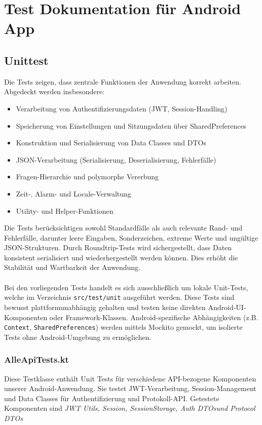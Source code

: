 \documentclass[a4paper,12pt]{article}
\begin{document}
\section{Test Dokumentation für Android App}
\subsection{Unittest}
Die Tests zeigen, dass zentrale Funktionen der Anwendung korrekt arbeiten. 
Abgedeckt werden insbesondere:

\begin{itemize}
  \item Verarbeitung von Authentifizierungsdaten (JWT, Session-Handling)
  \item Speicherung von Einstellungen und Sitzungsdaten über SharedPreferences
  \item Konstruktion und Serialisierung von Data Classes und DTOs
  \item JSON-Verarbeitung (Serialisierung, Deserialisierung, Fehlerfälle)
  \item Fragen-Hierarchie und polymorphe Vererbung
  \item Zeit-, Alarm- und Locale-Verwaltung
  \item Utility- und Helper-Funktionen
\end{itemize}
Die Tests berücksichtigen sowohl Standardfälle als auch relevante
Rand- und Fehlerfälle, darunter leere Eingaben, Sonderzeichen,
extreme Werte und ungültige JSON-Strukturen.
Durch Roundtrip-Tests wird sichergestellt, dass Daten konsistent
serialisiert und wiederhergestellt werden können.
Dies erhöht die Stabilität und Wartbarkeit der Anwendung.\\\\
Bei den vorliegenden Tests handelt es sich ausschließlich um lokale
Unit-Tests, welche im Verzeichnis \texttt{src/test/unit} ausgeführt werden. Diese Tests sind bewusst plattformunabhängig gehalten und testen keine
direkten Android-UI-Komponenten oder Framework-Klassen. Android-spezifische Abhängigkeiten (z.B. \texttt{Context}, \texttt{SharedPreferences}) werden mittels Mockito gemockt, um isolierte Tests ohne Android-Umgebung zu ermöglichen.
\subsubsection{AlleApiTests.kt}
Diese Testklasse enthält Unit Tests für verschiedene API-bezogene Komponenten unserer Android-Anwendung. Sie testet JWT-Verarbeitung, Session-Management und Data Classes für Authentifizierung und Protokoll-API.
Getestete Komponenten sind \textit{JWT Utils, Session, SessionStorage, Auth DTOsund Protocol DTOs}\\
\vspace{1em}
\end{document}
